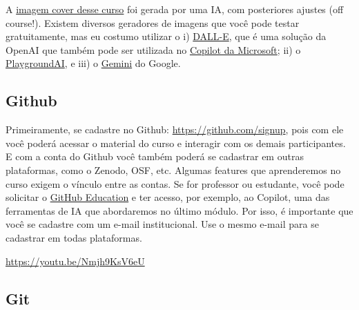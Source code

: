 \documentclass[
  a4paper,
]{article}
\begin{document}
\begin{tcolorbox}[enhanced jigsaw, leftrule=.75mm, left=2mm, toprule=.15mm, opacitybacktitle=0.6, colback=white, titlerule=0mm, colbacktitle=quarto-callout-note-color!10!white, bottomtitle=1mm, bottomrule=.15mm, opacityback=0, rightrule=.15mm, toptitle=1mm, title=\textcolor{quarto-callout-note-color}{\faInfo}\hspace{0.5em}{Outra curiosidade\ldots{}}, colframe=quarto-callout-note-color-frame, arc=.35mm, breakable, coltitle=black]

A
\href{https://phdpablo.github.io/curso-open-science/img/cover.png}{imagem
cover desse curso} foi gerada por uma IA, com posteriores ajustes (off
course!). Existem diversos geradores de imagens que você pode testar
gratuitamente, mas eu costumo utilizar o i)
\href{https://openai.com/dall-e/}{DALL-E}, que é uma solução da OpenAI
que também pode ser utilizada no
\href{https://copilot.microsoft.com/}{Copilot da Microsoft}; ii) o
\href{https://playgroundai.com/}{PlaygroundAI}, e iii) o
\href{https://gemini.google.com/app}{Gemini} do Google.

\end{tcolorbox}

\subsection*{Github}\label{sec-githubprework}


Primeiramente, se cadastre no Github: \url{https://github.com/signup},
pois com ele você poderá acessar o material do curso e interagir com os
demais participantes. E com a conta do Github você também poderá se
cadastrar em outras plataformas, como o Zenodo, OSF, etc. Algumas
features que aprenderemos no curso exigem o vínculo entre as contas. Se
for professor ou estudante, você pode solicitar o
\href{https://education.github.com/}{GitHub Education} e ter acesso, por
exemplo, ao Copilot, uma das ferramentas de IA que abordaremos no último
módulo. Por isso, é importante que você se cadastre com um e-mail
institucional. Use o mesmo e-mail para se cadastrar em todas
plataformas.

\url{https://youtu.be/Nmjh9KsV6eU}

\subsection*{Git}\label{sec-gitprework}
\end{document}
